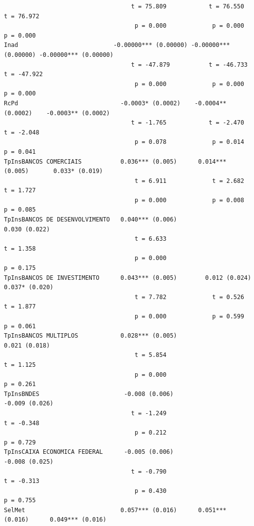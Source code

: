\documentclass[12pt,12pt,openright,oneside,a4paper,chapter=TITLE,section=TITLE,subsection=TITLE,subsubsection=TITLE,english,french,spanish,portugues,sumario=tradicional]{abntex2}
\begin{document}
\begin{verbatim}
                                    t = 75.809            t = 76.550            t = 76.972      
                                     p = 0.000             p = 0.000             p = 0.000      
Inad                           -0.00000*** (0.00000) -0.00000*** (0.00000) -0.00000*** (0.00000)
                                    t = -47.879           t = -46.733           t = -47.922     
                                     p = 0.000             p = 0.000             p = 0.000      
RcPd                             -0.0003* (0.0002)    -0.0004** (0.0002)    -0.0003** (0.0002)  
                                    t = -1.765            t = -2.470            t = -2.048      
                                     p = 0.078             p = 0.014             p = 0.041      
TpInsBANCOS COMERCIAIS           0.036*** (0.005)      0.014*** (0.005)       0.033* (0.019)    
                                     t = 6.911             t = 2.682             t = 1.727      
                                     p = 0.000             p = 0.008             p = 0.085      
TpInsBANCOS DE DESENVOLVIMENTO   0.040*** (0.006)                              0.030 (0.022)    
                                     t = 6.633                                   t = 1.358      
                                     p = 0.000                                   p = 0.175      
TpInsBANCOS DE INVESTIMENTO      0.043*** (0.005)        0.012 (0.024)        0.037* (0.020)    
                                     t = 7.782             t = 0.526             t = 1.877      
                                     p = 0.000             p = 0.599             p = 0.061      
TpInsBANCOS MULTIPLOS            0.028*** (0.005)                              0.021 (0.018)    
                                     t = 5.854                                   t = 1.125      
                                     p = 0.000                                   p = 0.261      
TpInsBNDES                        -0.008 (0.006)                              -0.009 (0.026)    
                                    t = -1.249                                  t = -0.348      
                                     p = 0.212                                   p = 0.729      
TpInsCAIXA ECONOMICA FEDERAL      -0.005 (0.006)                              -0.008 (0.025)    
                                    t = -0.790                                  t = -0.313      
                                     p = 0.430                                   p = 0.755      
SelMet                           0.057*** (0.016)      0.051*** (0.016)      0.049*** (0.016)   

\end{verbatim}
\end{document}
